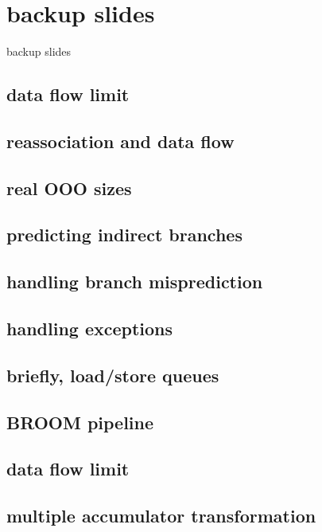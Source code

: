 
\section{backup slides}
\begin{frame}{backup slides}
\end{frame}

\subsection{data flow limit}


\subsection{reassociation and data flow}


\subsection{real OOO sizes}


\subsection{predicting indirect branches}


\subsection{handling branch misprediction}


\subsection{handling exceptions}
 

\subsection{briefly, load/store queues}

\subsection{BROOM pipeline}

\subsection{data flow limit}


\subsection{multiple accumulator transformation}

